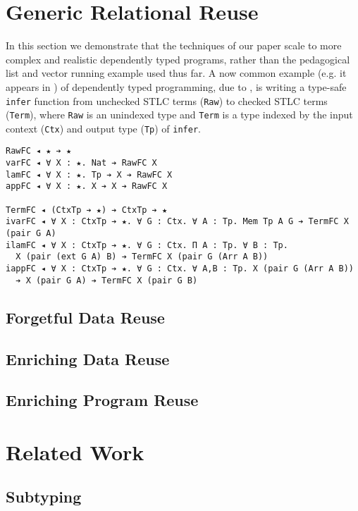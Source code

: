 \documentclass[acmsmall]{acmart}\settopmatter{}
\newcommand{\labsec}[1]{\label{sec:#1}}
\begin{document}
\section{Generic Relational Reuse}
\labsec{rel}

In this section we demonstrate that the techniques of our paper scale
to more complex and realistic dependently typed programs, rather than
the pedagogical list and vector running example used thus far. A now
common example (e.g. it appears in \cite{tutorial:agda})
of dependently typed programming, due to \citet{viewfromleft}, 
is writing a type-safe \verb;infer; function from unchecked STLC terms
(\verb;Raw;) to checked STLC terms (\verb;Term;), where \verb;Raw; is an
unindexed type and \verb;Term; is a type indexed by the input
context (\verb;Ctx;) and output type (\verb;Tp;) of \verb;infer;.

\begin{verbatim}
RawFC ◂ ★ ➔ ★
varFC ◂ ∀ X : ★. Nat ➔ RawFC X
lamFC ◂ ∀ X : ★. Tp ➔ X ➔ RawFC X
appFC ◂ ∀ X : ★. X ➔ X ➔ RawFC X

TermFC ◂ (CtxTp ➔ ★) ➔ CtxTp ➔ ★
ivarFC ◂ ∀ X : CtxTp ➔ ★. ∀ G : Ctx. ∀ A : Tp. Mem Tp A G ➔ TermFC X (pair G A)
ilamFC ◂ ∀ X : CtxTp ➔ ★. ∀ G : Ctx. Π A : Tp. ∀ B : Tp. 
  X (pair (ext G A) B) ➔ TermFC X (pair G (Arr A B))
iappFC ◂ ∀ X : CtxTp ➔ ★. ∀ G : Ctx. ∀ A,B : Tp. X (pair G (Arr A B))           
  ➔ X (pair G A) ➔ TermFC X (pair G B)
\end{verbatim}

\subsection{Forgetful Data Reuse}
\labsec{rel:dfog}

\subsection{Enriching Data Reuse}
\labsec{rel:denr}

\subsection{Enriching Program Reuse}
\labsec{rel:penr}

\section{Related Work}
\labsec{others}

\subsection{Subtyping}
\labsec{others:judg}
\end{document}
